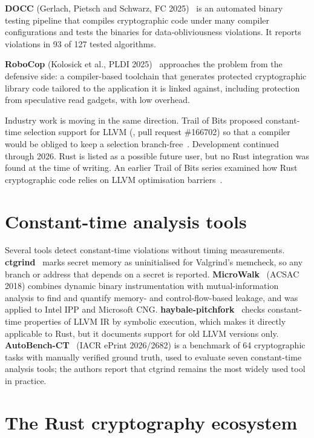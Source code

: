 \textbf{DOCC} (Gerlach, Pietsch and Schwarz, FC 2025)~\cite{docc} is an automated binary testing pipeline that compiles cryptographic code under many compiler configurations and tests the binaries for data-obliviousness violations. It reports violations in 93 of 127 tested algorithms.

\textbf{RoboCop} (Kolosick et al., PLDI 2025)~\cite{robocop} approaches the problem from the defensive side: a compiler-based toolchain that generates protected cryptographic library code tailored to the application it is linked against, including protection from speculative read gadgets, with low overhead.

Industry work is moving in the same direction. Trail of Bits proposed constant-time selection support for LLVM (, pull request \#166702) so that a compiler would be obliged to keep a selection branch-free~\cite{tobctselect}. Development continued through 2026. Rust is listed as a possible future user, but no Rust integration was found at the time of writing. An earlier Trail of Bits series examined how Rust cryptographic code relies on LLVM optimisation barriers~\cite{tobrust}.

\section{Constant-time analysis tools}
\label{sec:lit_tools}

Several tools detect constant-time violations without timing measurements. \textbf{ctgrind}~\cite{ctgrind} marks secret memory as uninitialised for Valgrind's memcheck, so any branch or address that depends on a secret is reported. \textbf{MicroWalk}~\cite{microwalk} (ACSAC 2018) combines dynamic binary instrumentation with mutual-information analysis to find and quantify memory- and control-flow-based leakage, and was applied to Intel IPP and Microsoft CNG. \textbf{haybale-pitchfork}~\cite{pitchfork} checks constant-time properties of LLVM IR by symbolic execution, which makes it directly applicable to Rust, but it documents support for old LLVM versions only. \textbf{AutoBench-CT}~\cite{autobenchct} (IACR ePrint 2026/2682) is a benchmark of 64 cryptographic tasks with manually verified ground truth, used to evaluate seven constant-time analysis tools; the authors report that ctgrind remains the most widely used tool in practice.

\section{The Rust cryptography ecosystem}
\label{sec:lit_rust}

